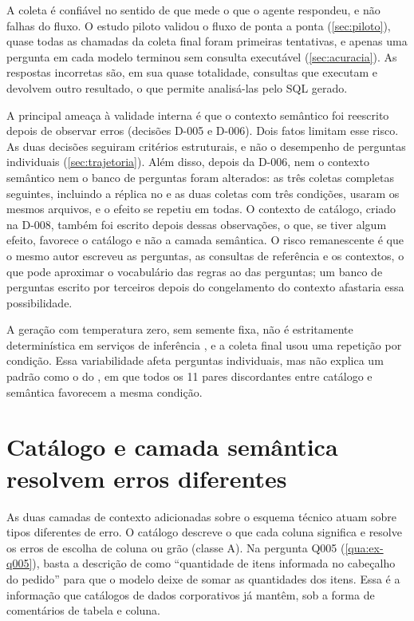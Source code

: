 A coleta é confiável no sentido de que mede o que o agente respondeu, e
não falhas do fluxo. O estudo piloto validou o fluxo de ponta a ponta
(\autoref{sec:piloto}), quase todas as chamadas da coleta final foram
primeiras tentativas, e apenas uma pergunta em cada modelo terminou sem
consulta executável (\autoref{sec:acuracia}). As respostas incorretas são,
em sua quase totalidade, consultas que executam e devolvem outro resultado,
o que permite analisá-las pelo SQL gerado.

A principal ameaça à validade interna é que o contexto semântico foi
reescrito depois de observar erros (decisões D-005 e D-006). Dois fatos
limitam esse risco. As duas decisões seguiram critérios estruturais, e não
o desempenho de perguntas individuais (\autoref{sec:trajetoria}). Além
disso, depois da D-006, nem o contexto semântico nem o banco de perguntas
foram alterados: as três coletas completas seguintes, incluindo a réplica no
 e as duas coletas com três condições, usaram os mesmos
arquivos, e o efeito se repetiu em todas. O contexto de catálogo, criado
na D-008, também foi escrito depois dessas observações, o que, se tiver
algum efeito, favorece o catálogo e não a camada semântica. O risco
remanescente é que o mesmo autor escreveu as perguntas, as consultas de
referência e os contextos, o que pode aproximar o vocabulário das
regras ao das perguntas; um banco de perguntas escrito por terceiros
depois do congelamento do contexto afastaria essa possibilidade.

A geração com temperatura zero, sem semente fixa, não é estritamente
determinística em serviços de inferência \cite{atil2025nondeterminism},
e a coleta final usou uma repetição por condição. Essa
variabilidade afeta perguntas individuais, mas não explica um padrão como
o do , em que todos os 11 pares discordantes entre
catálogo e semântica favorecem a mesma condição.

\section{Catálogo e camada semântica resolvem erros diferentes}
\label{sec:catalogo-vs-semantica}

As duas camadas de contexto adicionadas sobre o esquema técnico atuam
sobre tipos diferentes de erro. O catálogo descreve o que cada coluna
significa e resolve os erros de escolha de coluna ou grão (classe A). Na
pergunta Q005 (\autoref{qua:ex-q005}), basta a descrição de
 como ``quantidade de itens informada no cabeçalho
do pedido'' para que o modelo deixe de somar as quantidades dos itens.
Essa é a informação que catálogos de dados corporativos já mantêm, sob a
forma de comentários de tabela e coluna.

